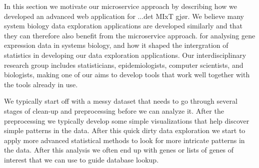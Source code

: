 In this section we motivate our microservice approach by describing how we developed an advanced web application for ...det MIxT gjør. We believe many system biology data exploration applications are developed similarly and that they can therefore also benefit from the microservice approach.
%
for analysing gene expression data in systems biology, and how it shaped the intergration of
statistics in developing our data exploration applications. 
Our interdisciplinary research group includes statisticians, epidemiologists, computer scientists, and biologists, making one of our
aims to develop tools that work well together with the tools already in use. 

We typically start off with a messy dataset that needs to go through
several stages of clean-up and preprocessing before we can analyze it.
After the
preprocessing we typically develop some simple visualizations that help discover 
simple patterns in the data. 
After this quick dirty data exploration we start to
apply more advanced statistical methods to look for more intricate patterns in
the data.
After this analysis we often end up with genes or lists of genes of
interest that we can use to guide database lookup.


